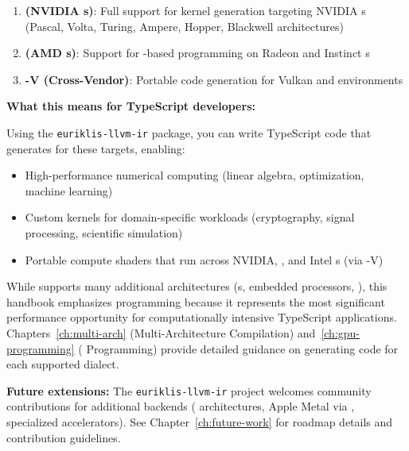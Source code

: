 \begin{enumerate}[noitemsep]
  \item \textbf{  (NVIDIA s)}: Full support for  kernel generation targeting NVIDIA s (Pascal, Volta, Turing, Ampere, Hopper, Blackwell architectures)
  \item \textbf{ (AMD s)}: Support for -based  programming on  Radeon and Instinct s
  \item \textbf{-V (Cross-Vendor)}: Portable  code generation for Vulkan and  environments
\end{enumerate}

\textbf{What this means for TypeScript developers:}

Using the \texttt{euriklis-llvm-ir} package, you can write TypeScript code that generates   for these  targets, enabling:

\begin{itemize}[noitemsep]
  \item High-performance numerical computing (linear algebra, optimization, machine learning)
  \item Custom  kernels for domain-specific workloads (cryptography, signal processing, scientific simulation)
  \item Portable compute shaders that run across NVIDIA, , and Intel s (via -V)
\end{itemize}

While  supports many additional architectures (s, embedded processors, ), this handbook emphasizes  programming because it represents the most significant performance opportunity for computationally intensive TypeScript applications. Chapters~\ref{ch:multi-arch} (Multi-Architecture Compilation) and~\ref{ch:gpu-programming} ( Programming) provide detailed guidance on generating code for each supported  dialect.

\textbf{Future extensions:} The \texttt{euriklis-llvm-ir} project welcomes community contributions for additional backends ( architectures, Apple Metal via , specialized accelerators). See Chapter~\ref{ch:future-work} for roadmap details and contribution guidelines.
